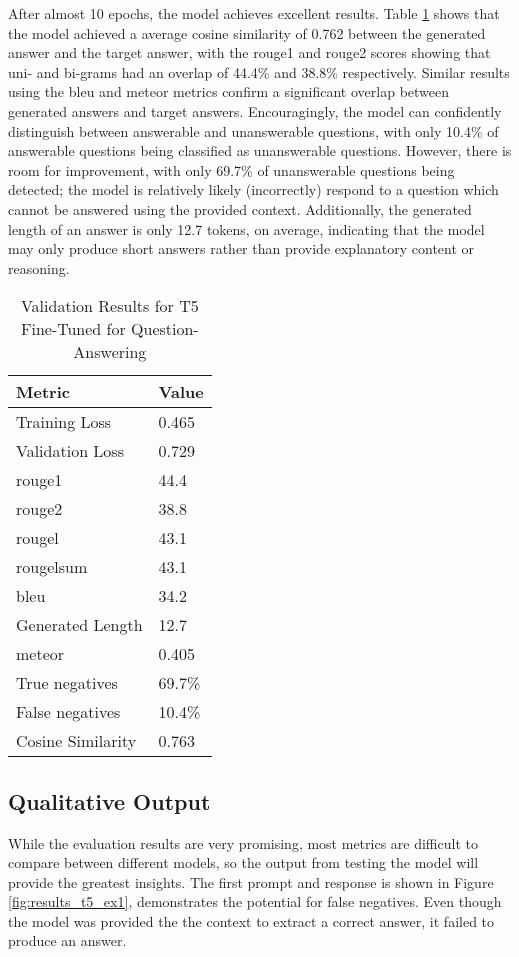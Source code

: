 After almost 10 epochs, the model achieves excellent results. Table \ref{tab:results_t5} shows that the model achieved a average cosine similarity of 0.762 between the generated answer and the target answer, with the \acrshort{rouge}1 and \acrshort{rouge}2 scores showing that uni- and bi-grams had an overlap of 44.4\% and 38.8\% respectively. Similar results using the \acrshort{bleu} and \acrshort{meteor} metrics confirm a significant overlap between generated answers and target answers. Encouragingly, the model can confidently distinguish between answerable and unanswerable questions, with only 10.4\% of answerable questions being classified as unanswerable questions. However, there is room for improvement, with only 69.7\% of unanswerable questions being detected; the model is relatively likely (incorrectly) respond to a question which cannot be answered using the provided context. Additionally, the generated length of an answer is only 12.7 tokens, on average, indicating that the model may only produce short answers rather than provide explanatory content or reasoning. 

\begin{table}[ht!]
    \centering
    \begin{tabular}{l|l}
        \textbf{Metric} & \textbf{Value} \\ \hline
        Training Loss & 0.465 \\ \hline
        Validation Loss & 0.729 \\ \hline
        \acrshort{rouge}1 & 44.4 \\ \hline
        \acrshort{rouge}2 & 38.8 \\ \hline
        \acrshort{rouge}l & 43.1 \\ \hline
        \acrshort{rouge}lsum & 43.1 \\ \hline
        \acrshort{bleu} & 34.2 \\ \hline
        Generated Length & 12.7 \\ \hline
        \acrshort{meteor} & 0.405 \\ \hline
        True negatives & 69.7\% \\ \hline
        False negatives & 10.4\% \\ \hline
        Cosine Similarity & 0.763 \\
    \end{tabular}
    \caption{Validation Results for T5 Fine-Tuned for Question-Answering}
    \label{tab:results_t5}
\end{table}

\subsection{Qualitative Output}
While the evaluation results are very promising, most metrics are difficult to compare between different models, so the output from testing the model will provide the greatest insights. The first prompt and response is shown in Figure \ref{fig:results_t5_ex1}, demonstrates the potential for false negatives. Even though the model was provided the the context to extract a correct answer, it failed to produce an answer.

